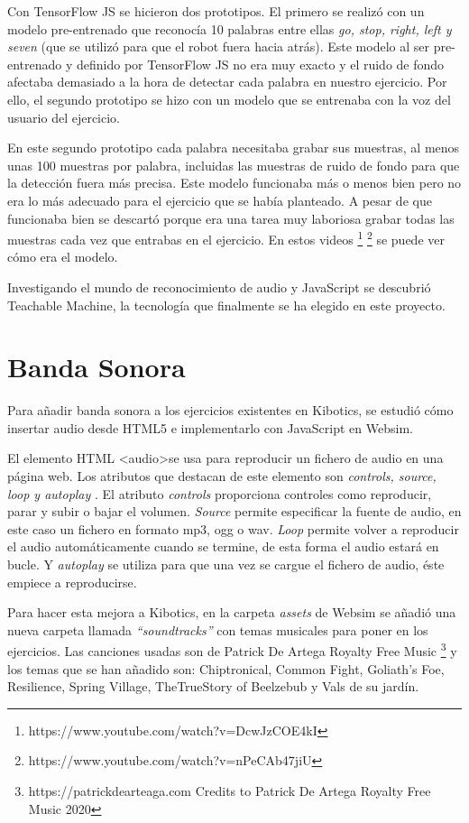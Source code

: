 Con TensorFlow JS se hicieron dos prototipos. El primero se realizó con un modelo pre-entrenado que reconocía 10 palabras entre ellas \textit{go, stop, right, left y seven} (que se utilizó para que el robot fuera hacia atrás).
Este modelo al ser pre-entrenado y definido por TensorFlow JS no era muy exacto y el ruido de fondo afectaba demasiado a la hora de detectar cada palabra en nuestro ejercicio. Por ello, el segundo prototipo se hizo con un modelo que se entrenaba con la voz del usuario del ejercicio.

En este segundo prototipo cada palabra necesitaba grabar sus muestras, al menos unas 100 muestras por palabra, incluidas las muestras de ruido de fondo para que la detección fuera más precisa. Este modelo funcionaba más o menos bien pero no era lo más adecuado para el ejercicio que se había planteado. A pesar de que funcionaba bien se descartó porque era una tarea muy laboriosa grabar todas las muestras cada vez que entrabas en el ejercicio. 
En estos videos \footnote{https://www.youtube.com/watch?v=DcwJzCOE4kI}
\footnote{https://www.youtube.com/watch?v=nPeCAb47jiU} se puede ver cómo era el modelo.

Investigando el mundo de reconocimiento de audio y JavaScript se descubrió Teachable Machine, la tecnología que finalmente se ha elegido en este proyecto.


\section{Banda Sonora}

Para añadir banda sonora a los ejercicios existentes en Kibotics, se estudió cómo insertar audio desde HTML5 e implementarlo con JavaScript en Websim.

El elemento HTML \textless audio\textgreater  se usa para reproducir un fichero de audio en una página web.
Los atributos que destacan de este elemento son \textit{controls, source, loop y autoplay }.
El atributo \textit{controls} proporciona controles como reproducir, parar y subir o bajar el volumen.
 \textit{Source} permite especificar la fuente de audio, en este caso un fichero en formato mp3, ogg o wav. \textit{Loop} permite volver a reproducir el audio automáticamente cuando se termine, de esta forma  el audio estará en bucle. Y \textit{autoplay} se utiliza para que una vez se cargue el fichero de audio, éste empiece a reproducirse.

Para hacer esta mejora a Kibotics, en la carpeta \textit{assets} de Websim se añadió una nueva carpeta llamada \textit{``soundtracks''} con temas musicales para poner en los ejercicios. Las canciones usadas son de Patrick De Artega Royalty Free Music  \footnote{ https://patrickdearteaga.com Credits to Patrick De Artega Royalty Free Music 2020}
y los temas que se han añadido son:
Chiptronical, Common Fight, Goliath's Foe, Resilience, Spring Village, TheTrueStory of Beelzebub y Vals de su jardín.


